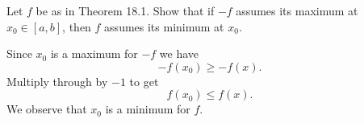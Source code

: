 
Let $f$ be as in Theorem 18.1. Show that if $-f$ assumes its maximum at
$x_0\in[a,b]$, then $f$ assumes its minimum at $x_0$.

\medskip
Since $x_0$ is a maximum for $-f$ we have
$$-f(x_0)\ge-f(x).$$
Multiply through by $-1$ to get
$$f(x_0)\le f(x).$$
We observe that $x_0$ is a minimum for $f$.

